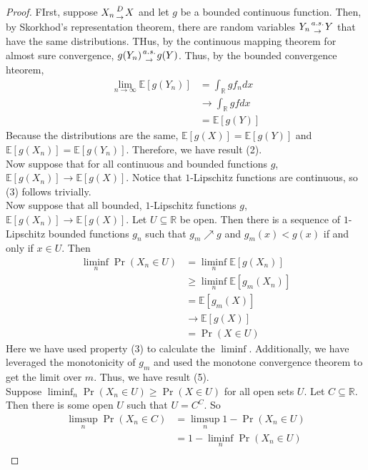 \documentclass{article}
\theoremstyle{definition}\newtheorem{definition}{DEF}
\theoremstyle{definition}\newtheorem{example}{Ex}
\theoremstyle{lemma}\newtheorem{lemma}{Lemma}
\theoremstyle{corrolary}\newtheorem{corrolary}{Cor}
\begin{document}
\begin{proof}
FIrst, suppose $X_n {D \atop \rightarrow} X$ and let $g$ be a bounded continuous function.
Then, by Skorkhod's representation theorem, there are random variables $Y_n {a.s. \atop \rightarrow} Y$ that have the same distributions.
THus, by the continuous mapping theorem for almost sure convergence, $g(Y_n) {a.s. \atop \rightarrow} g(Y)$.
Thus, by the bounded convergence hteorem,
\begin{align*}
\lim_{n\rightarrow \infty} \mathbb{E}[g(Y_n)] 
&= \int_\mathbb{R} g f_n dx\\
&\rightarrow \int_\mathbb{R} g f dx\\
&= \mathbb{E}[g(Y)]
\end{align*}
Because the distributions are the same, $\mathbb{E}[g(X)]=\mathbb{E}[g(Y)]$ and $\mathbb{E}[g(X_n)] =\mathbb{E}[g(Y_n)]$.
Therefore, we have result (2). \\
Now suppose that for all continuous and bounded functions $g$, $\mathbb{E}[g(X_n)] \rightarrow \mathbb{E}[g(X)]$.
Notice that $1$-Lipschitz functions are continuous, so (3) follows trivially. \\
Now suppose that all bounded, $1$-Lipschitz functions $g$, $\mathbb{E}[g(X_n)] \rightarrow \mathbb{E}[g(X)]$.
Let $U\subseteq \mathbb{R}$ be open.
Then there is a sequence of $1$-Lipschitz bounded functions $g_n$ such that $g_m \nearrow g$ and $g_m (x) < g(x)$ if and only if $x \in U$.
Then
\begin{align*}
\liminf_n \Pr\left( X_n \in U\right) 
&= \liminf_n \mathbb{E}[g(X_n)] \\
&\geq \liminf_n \mathbb{E}[g_m(X_n)]\\
&=\mathbb{E}[g_m(X)] \\
&\rightarrow \mathbb{E}[g(X)] \\
&= \Pr\left( X \in U\right)
\end{align*}
Here we have used property (3) to calculate the $\liminf$.
Additionally, we have leveraged the monotonicity of $g_m$ and used the monotone convergence theorem to get the limit over $m$.
Thus, we have result (5). \\
Suppose $\liminf_n \Pr\left( X_n \in U\right) \geq \Pr \left( X \in U \right)$ for all open sets $U$.
Let $C\subseteq \mathbb{R}$.
Then there is some open $U$ such that $U=C^C$.
So
\begin{align*}
\limsup_n \Pr \left( X_n \in C \right)
&= \limsup_n 1 - \Pr \left( X_n \in U \right) \\
&= 1 - \liminf_n \Pr \left( X_n \in U \right) \\

\end{align*}
\end{proof}
\end{document}
